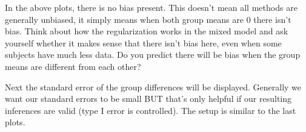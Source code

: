 \documentclass[
]{book}
\newenvironment{Shaded}{\begin{snugshade}}{\end{snugshade}}
\newcommand{\CommentTok}[1]{\textcolor[rgb]{0.56,0.35,0.01}{\textit{#1}}}
\newcommand{\DataTypeTok}[1]{\textcolor[rgb]{0.13,0.29,0.53}{#1}}
\newcommand{\KeywordTok}[1]{\textcolor[rgb]{0.13,0.29,0.53}{\textbf{#1}}}
\newcommand{\NormalTok}[1]{#1}
\newcommand{\OperatorTok}[1]{\textcolor[rgb]{0.81,0.36,0.00}{\textbf{#1}}}
\newcommand{\StringTok}[1]{\textcolor[rgb]{0.31,0.60,0.02}{#1}}
\begin{document}
In the above plots, there is no bias present. This doesn't mean all methods are generally unbiased, it simply means when both group means are 0 there isn't bias. Think about how the regularization works in the mixed model and ask yourself whether it makes sense that there isn't bias here, even when some subjects have much less data. Do you predict there will be bias when the group means are different from each other?

Next the standard error of the group differences will be displayed. Generally we want our standard errors to be small BUT that's only helpful if our resulting inferences are valid (type I error is controlled). The setup is similar to the last plots.

\begin{Shaded}
\end{Shaded}
\end{document}
